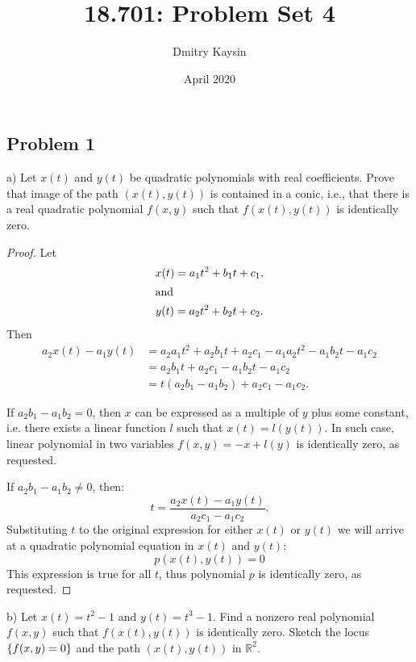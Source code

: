 \documentclass{article}
\title{18.701: Problem Set 4}
\author{Dmitry Kaysin}
\date{April 2020}
\theoremstyle{definition}
\newcommand{\R}{\mathbb{R}}
\DeclarePairedDelimiter\set{\{}{\}}
\begin{document}
\maketitle 


\subsection*{Problem 1}

\begin{tcolorbox}
a) Let $x(t)$ and $y(t)$ be quadratic polynomials with real coefficients.
Prove that image of the path $(x(t),y(t))$ is contained in a conic, i.e., that there is a real quadratic polynomial $f(x,y)$ such that $f(x(t),y(t))$ is identically zero.
\end{tcolorbox}

\begin{proof}

Let
\begin{gather*}
    x(t) = a_1 t^2 + b_1 t + c_1, \\
    \shortintertext{and}
    y(t) = a_2 t^2 + b_2 t + c_2.
\end{gather*}
Then
\begin{align*}
    a_2 x(t) - a_1 y(t) 
    & = a_2 a_1 t^2 + a_2 b_1 t + a_2 c_1
    - a_1 a_2 t^2 - a_1 b_2 t - a_1 c_2 \\
    & = a_2 b_1 t + a_2 c_1 - a_1 b_2 t - a_1 c_2 \\
    & = t (a_2 b_1 - a_1 b_2) + a_2 c_1 - a_1 c_2.
\end{align*}

If $a_2 b_1 - a_1 b_2 = 0$, then $x$ can be expressed as a multiple of $y$ plus some constant, i.e. there exists a linear function $l$ such that $x(t) = l(y(t))$.
In such case, linear polynomial in two variables $f(x,y) = -x + l(y)$ is identically zero, as requested.

If $a_2 b_1 - a_1 b_2 \neq 0$, then:
\[ t = \frac{a_2 x(t) - a_1 y(t)}{a_2 c_1 - a_1 c_2}. \]
Substituting $t$ to the original expression for either $x(t)$ or $y(t)$ we will arrive at a quadratic polynomial equation in $x(t)$ and $y(t)$:
\[ p(x(t),y(t)) = 0 \]
This expression is true for all $t$, thus polynomial $p$ is identically zero, as requested.

\end{proof}

\begin{tcolorbox}
b) Let $x(t) = t^2-1$ and $y(t) = t^3-1$.
Find a nonzero real polynomial $f(x,y)$ such that $f(x(t),y(t))$ is identically zero.
Sketch the locus $\set{f(x,y)=0}$ and the path $(x(t),y(t))$ in $\R^2$.
\end{tcolorbox}
\end{document}

